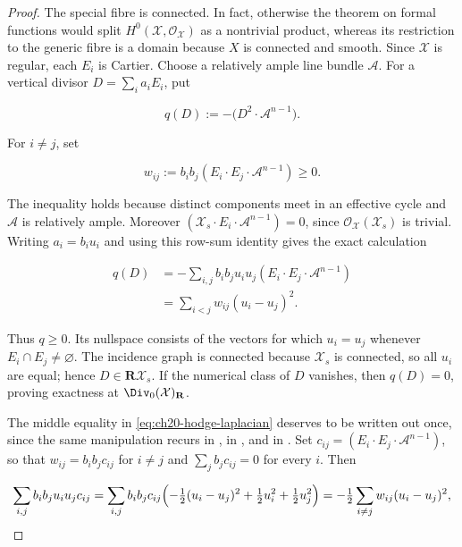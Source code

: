 \begin{proof}
The special fibre is connected.  In fact, otherwise the theorem on formal
functions would split $H^0(\mathcal X,\mathcal O_{\mathcal X})$ as a
nontrivial product, whereas its restriction to the generic fibre is a domain
because $X$ is connected and smooth.  Since $\mathcal X$ is regular,
each $E_i$ is Cartier.  Choose a relatively ample line bundle
$\mathcal A$.  For a vertical divisor $D=\sum_i a_iE_i$, put

\begin{equation}
\label{eq:ch20-hodge-quadratic}
 q(D):=-\bigl(D^2\cdot\mathcal A^{n-1}\bigr).
\end{equation}

For $i\ne j$, set

\begin{equation}
\label{eq:ch20-edge-weights}
 w_{ij}:=b_ib_j(E_i\cdot E_j\cdot\mathcal A^{n-1})\geq0.
\end{equation}

The inequality holds because distinct components meet in an effective
cycle and $\mathcal A$ is relatively ample.  Moreover
$(\mathcal X_s\cdot E_i\cdot\mathcal A^{n-1})=0$, since
$\mathcal O_{\mathcal X}(\mathcal X_s)$ is trivial.  Writing
$a_i=b_iu_i$ and using this row-sum identity gives the exact calculation

\begin{equation}
\label{eq:ch20-hodge-laplacian}
 \begin{aligned}
 q(D)
  &=-\sum_{i,j}b_ib_ju_iu_j
       (E_i\cdot E_j\cdot\mathcal A^{n-1})\\
  &=\sum_{i<j}w_{ij}(u_i-u_j)^2.
 \end{aligned}
\end{equation}

Thus $q\geq0$.  Its nullspace consists of the vectors for which
$u_i=u_j$ whenever $E_i\cap E_j\ne\varnothing$.  The incidence graph is
connected because $\mathcal X_s$ is connected, so all $u_i$ are equal;
hence $D\in\mathbf R\mathcal X_s$.  If the numerical class of $D$
vanishes, then $q(D)=0$, proving exactness at
$\Div_0(\mathcal X)_{\mathbf R}$.

The middle equality in \eqref{eq:ch20-hodge-laplacian} deserves to be
written out once, since the same manipulation recurs in
, in
, and in
.  Set $c_{ij}=(E_i\cdot E_j\cdot\mathcal A^{n-1})$,
so that $w_{ij}=b_ib_jc_{ij}$ for $i\ne j$ and
$\sum_jb_jc_{ij}=0$ for every $i$.  Then

\[
 \sum_{i,j}b_ib_ju_iu_jc_{ij}
 =\sum_{i,j}b_ib_jc_{ij}\Bigl(
   -\tfrac12(u_i-u_j)^2+\tfrac12u_i^2+\tfrac12u_j^2\Bigr)
 =-\tfrac12\sum_{i\ne j}w_{ij}(u_i-u_j)^2 ,
\]


\end{proof}
